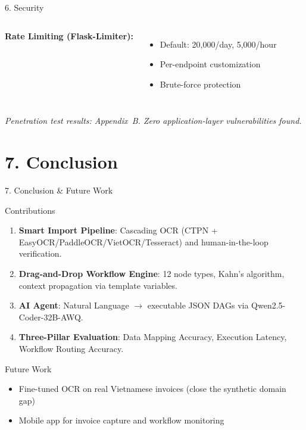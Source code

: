 \documentclass[10pt,aspectratio=169]{beamer}
\begin{document}
\begin{frame}{6. Security}
\begin{columns}
        \vspace{0.3cm}
        \textbf{Rate Limiting (Flask-Limiter):}
        \begin{itemize}
            \item Default: 20,000/day, 5,000/hour
            \item Per-endpoint customization
            \item Brute-force protection
        \end{itemize}
    \end{columns}

    \vspace{0.3cm}
    \centering\small
    \textit{Penetration test results: Appendix~B. Zero application-layer vulnerabilities found.}
\end{frame}

\section{7. Conclusion}

\begin{frame}{7. Conclusion \& Future Work}

    \begin{block}{Contributions}
        \begin{enumerate}
            \item \textbf{Smart Import Pipeline}: Cascading OCR (CTPN + EasyOCR/PaddleOCR/VietOCR/Tesseract) and human-in-the-loop verification.
            \item \textbf{Drag-and-Drop Workflow Engine}: 12 node types, Kahn's algorithm, context propagation via template variables.
            \item \textbf{AI Agent}: Natural Language $\rightarrow$ executable JSON DAGs via Qwen2.5-Coder-32B-AWQ. 
            \item \textbf{Three-Pillar Evaluation}: Data Mapping Accuracy, Execution Latency, Workflow Routing Accuracy.
        \end{enumerate}
    \end{block}

    \vspace{0.2cm}
    \begin{block}{Future Work}
        \begin{itemize}
            \item Fine-tuned OCR on real Vietnamese invoices (close the synthetic domain gap)
            \item Mobile app for invoice capture and workflow monitoring
        \end{itemize}
    \end{block}
\end{frame}
\end{document}
